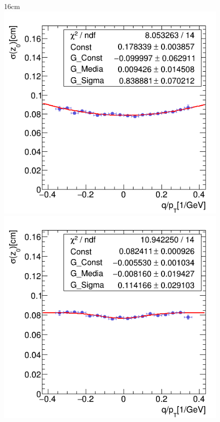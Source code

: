 \begin{figure}[htbp]{16cm}
\includegraphics[scale=0.28]{AppendixCMSL1TT/figs/r_z0_fit_single_pion_nopu}
\includegraphics[scale=0.28]{AppendixCMSL1TT/figs/r_z0_fit_single_muon_nopu}

\end{figure}
